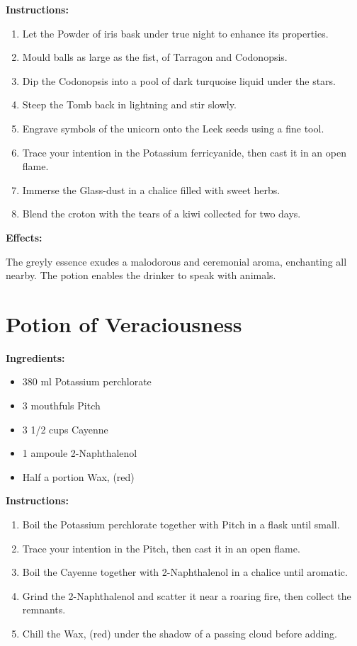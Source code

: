 \documentclass{article}
\begin{document}
\textbf{Instructions:}

\begin{enumerate}
  \item Let the Powder of iris bask under true night to enhance its properties.
  \item Mould balls as large as the fist, of Tarragon and Codonopsis.
  \item Dip the Codonopsis into a pool of dark turquoise liquid under the stars.
  \item Steep the Tomb back in lightning and stir slowly.
  \item Engrave symbols of the unicorn onto the Leek seeds using a fine tool.
  \item Trace your intention in the Potassium ferricyanide, then cast it in an open flame.
  \item Immerse the Glass-dust in a chalice filled with sweet herbs.
  \item Blend the croton with the tears of a kiwi collected for two days.
\end{enumerate}

\textbf{Effects:}

The greyly essence exudes a malodorous and ceremonial aroma, enchanting all nearby. The potion enables the drinker to speak with animals.

\newpage
\section*{Potion of Veraciousness}

\textbf{Ingredients:}

\begin{itemize}
  \item 380 ml Potassium perchlorate
  \item 3 mouthfuls Pitch
  \item 3 1/2 cups Cayenne
  \item 1 ampoule 2-Naphthalenol
  \item Half a portion Wax, (red)
\end{itemize}

\textbf{Instructions:}

\begin{enumerate}
  \item Boil the Potassium perchlorate together with Pitch in a flask until small.
  \item Trace your intention in the Pitch, then cast it in an open flame.
  \item Boil the Cayenne together with 2-Naphthalenol in a chalice until aromatic.
  \item Grind the 2-Naphthalenol and scatter it near a roaring fire, then collect the remnants.
  \item Chill the Wax, (red) under the shadow of a passing cloud before adding.
\end{enumerate}
\end{document}
